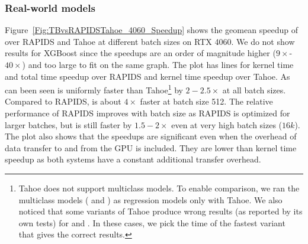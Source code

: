 \subsubsection*{Real-world models}
Figure~\ref{Fig:TBvsRAPIDSTahoe_4060_Speedup} shows the geomean speedup of \Treebeard{} over RAPIDS and Tahoe at different batch sizes on RTX 4060. 
We do not show results for XGBoost since the speedups are an order of magnitude higher ($9\times$-$40\times$) and too large to fit on the same graph.  
The plot has lines for kernel time and total time speedup over RAPIDS and kernel time speedup over Tahoe. As can been seen 
\Treebeard{} is uniformly faster than Tahoe{\footnote{Tahoe does not support multiclass models. To enable comparison, we ran 
the multiclass models ( and ) as regression models only with Tahoe. We also noticed that some variants
of Tahoe produce wrong results (as reported by its own tests) for  and . In these cases, we pick the 
time of the fastest variant that gives the correct results.}} by $2-2.5\times$ at all batch sizes. 
Compared to RAPIDS, \Treebeard{} is about $4\times$ faster at batch size 512. The relative performance of RAPIDS improves 
with batch size as RAPIDS is optimized for larger batches, but \Treebeard{} is still faster by $1.5-2\times$ even at very high batch sizes ($16k$). 
The plot also shows that the speedups are significant even when the overhead of data transfer to and from the GPU
is included. They are lower than kernel time speedup as both systems have a constant additional transfer overhead.

